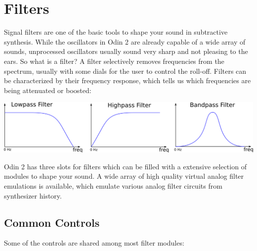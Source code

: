 \chapter{Filters}

\label{filters}
Signal filters are one of the basic tools to shape your sound in subtractive synthesis. While the oscillators in Odin 2 are already capable of a wide array of sounds, unprocessed oscillators usually sound very sharp and not pleasing to the ears. So what is a filter? A filter selectively removes frequencies from the spectrum, usually with some dials for the user to control the roll-off. Filters can be characterized by their frequency response, which tells us which frequencies are being attenuated or boosted:

\vspace{5mm}
\begin{center}
    \includegraphics[width=\textwidth]{graphics/filter.png}
\end{center}

\vspace{5mm}

Odin 2 has three slots for filters which can be filled with a extensive selection of modules to shape your sound. A wide array of high quality virtual analog filter emulations is available, which emulate various analog filter circuits from synthesizer history.


\section{Common Controls}
Some of the controls are shared among most filter modules:

